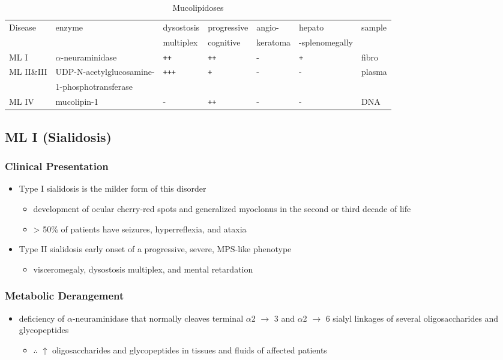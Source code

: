 \documentclass[12pt]{scrartcl}
\begin{document}
\begin{table}[htbp]
\caption{\label{tab:org6c7ba6e}Mucolipidoses}
\centering
\small
\begin{tabular}{lllllll}
Disease & enzyme & dysostosis & progressive & angio- & hepato & sample\\
 &  & multiplex & cognitive & keratoma & -splenomegally & \\
\hline
ML I & \(\alpha\)-neuraminidase & \texttt{++} & \texttt{++} & - & \texttt{+} & fibro\\
ML II\&III & UDP-N-acetylglucosamine- & \texttt{+++} & \texttt{+} & - & - & plasma\\
 & 1-phosphotransferase &  &  &  &  & \\
ML IV & mucolipin-1 & - & \texttt{++} & - & - & DNA\\
\end{tabular}
\end{table}

\subsection{ML I (Sialidosis)}
\label{sec:org64590a4}
\subsubsection{Clinical Presentation}
\label{sec:orgf5d2072}
\begin{itemize}
\item Type I sialidosis is the milder form of this disorder
\begin{itemize}
\item development of ocular cherry-red spots and generalized
myoclonus in the second or third decade of life
\item \textgreater{} 50\% of patients have seizures, hyperreflexia, and ataxia
\end{itemize}

\item Type II sialidosis early onset of a progressive, severe, MPS-like
phenotype
\begin{itemize}
\item visceromegaly, dysostosis multiplex, and mental retardation
\end{itemize}
\end{itemize}

\subsubsection{Metabolic Derangement}
\label{sec:orgfa7d723}
\begin{itemize}
\item deficiency of \(\alpha\)-neuraminidase that normally cleaves terminal
\(\alpha\)2 \(\to\) 3 and \(\alpha\)2 \(\to\) 6 sialyl linkages of several
oligosaccharides and glycopeptides
\begin{itemize}
\item \(\therefore\) \(\uparrow\) oligosaccharides and glycopeptides in tissues
and fluids of affected patients
\end{itemize}
\end{itemize}
\end{document}
